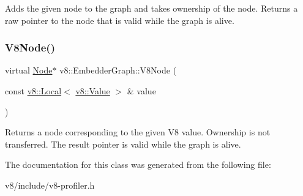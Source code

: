 Adds the given node to the graph and takes ownership of the node. Returns a raw pointer to the node that is valid while the graph is alive. \mbox{\label{classv8_1_1EmbedderGraph_a6fdb5451611738dd44c70d195445d0ff}} 
\subsubsection{\texorpdfstring{V8\+Node()}{V8Node()}}
{\footnotesize\ttfamily virtual \mbox{\hyperlink{classv8_1_1EmbedderGraph_1_1Node}{Node}}$\ast$ v8\+::\+Embedder\+Graph\+::\+V8\+Node (\begin{DoxyParamCaption}\item[{const \mbox{\hyperlink{classv8_1_1Local}{v8\+::\+Local}}$<$ \mbox{\hyperlink{classv8_1_1Value}{v8\+::\+Value}} $>$ \&}]{value }\end{DoxyParamCaption})\hspace{0.3cm}{\ttfamily [pure virtual]}}

Returns a node corresponding to the given V8 value. Ownership is not transferred. The result pointer is valid while the graph is alive. 

The documentation for this class was generated from the following file\+:\begin{DoxyCompactItemize}
\item 
v8/include/v8-\/profiler.\+h\end{DoxyCompactItemize}
